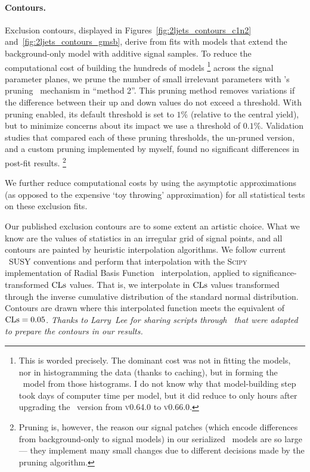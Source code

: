 \paragraph{Contours.}
Exclusion contours, displayed in
Figures~\ref{fig:2ljets_contours_c1n2} and~\ref{fig:2ljets_contours_gmsb},
derive from fits with models that extend the background-only model with
additive signal samples.
To reduce the computational cost of building the hundreds of models%
\footnote{%
This is worded precisely. The dominant cost was not in fitting the models, nor
in histogramming the data (thanks to caching), but in forming the
\histfactory\ model from those histograms.
I do not know why that model-building step took days of computer time per
model, but it did reduce to only hours after upgrading the \histfitter\ version
from \textsc{v0.64.0} to \textsc{v0.66.0}.
}
across the signal parameter planes, we prune the number of small irrelevant
parameters with \histfitter's pruning~\cite{histfittergithub} mechanism in
``method 2''.
This pruning method removes variations if the difference between their up and
down values do not exceed a threshold.
With pruning enabled, its default threshold is set to $1\%$ (relative to the
central yield), but to minimize concerns about its impact we use a threshold
of $0.1\%$.
Validation studies that compared each of these pruning thresholds, the
un-pruned version, and a custom pruning implemented by myself, found no
significant differences in post-fit results.%
\footnote{%
Pruning is, however, the reason our signal patches (which encode differences
from background-only to signal models) in our serialized \hepdata\ models are
so large --- they implement many small changes due to different decisions made
by the pruning algorithm.
}

We further reduce computational costs by using the asymptotic approximations
(as opposed to the expensive `toy throwing' approximation) for all statistical
tests on these exclusion fits.

Our published exclusion contours are to some extent an artistic choice.
What we know are the values of statistics in an irregular grid of
signal points,
and all contours are painted by heuristic interpolation algorithms.
We follow current \atlas\ SUSY conventions and perform that interpolation
with the \textsc{Scipy} implementation of
Radial Basis Function~\cite{2020SciPy-NMeth,fasshauer2007meshfree}
interpolation, applied to significance-transformed $\mathrm{CLs}$ values.
That is, we interpolate in $\mathrm{CLs}$ values transformed through the inverse
cumulative distribution of the standard normal distribution.
Contours are drawn where this interpolated function meets the equivalent of
$\mathrm{CLs} = 0.05$.
\emph{%
Thanks to Larry~Lee for sharing scripts through \histfitter\ that were adapted
to prepare the contours in our results.%
}

